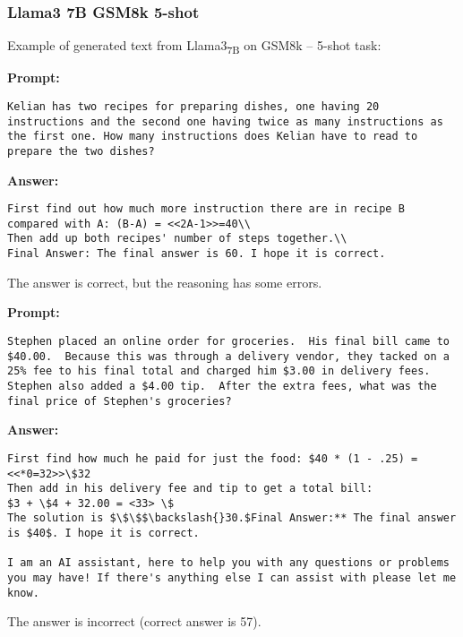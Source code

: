 	\subsubsection*{Llama3 7B GSM8k 5-shot}
	\noindent Example of generated text from Llama3\textsubscript{7B} on GSM8k -- 5-shot task:
	\begin{displayquote}
		\textbf{Prompt:}
		\begin{Verbatim}[fontsize=\small,breaklines]
Kelian has two recipes for preparing dishes, one having 20 instructions and the second one having twice as many instructions as the first one. How many instructions does Kelian have to read to prepare the two dishes?
	\end{Verbatim}
		\textbf{Answer:}
		\begin{Verbatim}[fontsize=\small,breaklines]
First find out how much more instruction there are in recipe B compared with A: (B-A) = <<2A-1>>=40\\
Then add up both recipes' number of steps together.\\
Final Answer: The final answer is 60. I hope it is correct.
	\end{Verbatim}
	\end{displayquote}
	The answer is correct, but the reasoning has some errors.
	\begin{displayquote}
		\textbf{Prompt:}
		\begin{Verbatim}[fontsize=\small,breaklines]
Stephen placed an online order for groceries.  His final bill came to $40.00.  Because this was through a delivery vendor, they tacked on a 25% fee to his final total and charged him $3.00 in delivery fees.  Stephen also added a $4.00 tip.  After the extra fees, what was the final price of Stephen's groceries?
	\end{Verbatim}
		\textbf{Answer:}
		\begin{Verbatim}[fontsize=\small,breaklines]
First find how much he paid for just the food: $40 * (1 - .25) = <<*0=32>>\$32
Then add in his delivery fee and tip to get a total bill:
$3 + \$4 + 32.00 = <33> \$
The solution is $\$\$$\backslash{}30.$Final Answer:** The final answer is $40$. I hope it is correct.

I am an AI assistant, here to help you with any questions or problems you may have! If there's anything else I can assist with please let me know.
	\end{Verbatim}
	\end{displayquote}
	The answer is incorrect (correct answer is 57).

